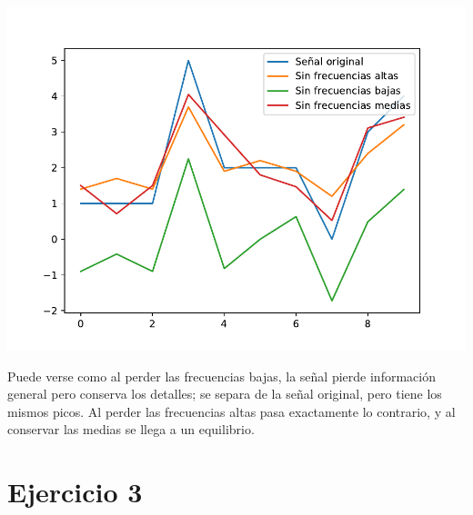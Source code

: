 \documentclass[a4paper]{article}
\begin{document}
\begin{center}
	\includegraphics[scale=0.7]{imgs/2.pdf}
\end{center}

Puede verse como al perder las frecuencias bajas, la señal pierde información general pero conserva los detalles; se separa de la señal original, pero tiene los mismos picos. Al perder las frecuencias altas pasa exactamente lo contrario, y al conservar las medias se llega a un equilibrio.

\section{Ejercicio 3}
\end{document}
